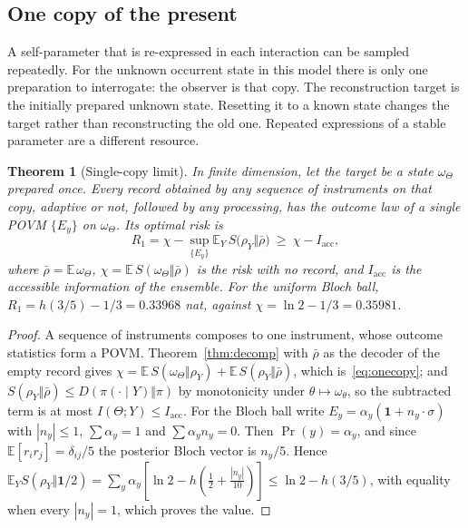 \documentclass[12pt]{article}
\newtheorem{theorem}{Theorem}[section]
\theoremstyle{definition}
\theoremstyle{remark}
\newcommand{\E}{\mathbb E}
\begin{document}
\subsection{One copy of the present}

A self-parameter that is re-expressed in each interaction can be sampled repeatedly. For the unknown occurrent state in this model there is only one preparation to interrogate: the observer is that copy. The reconstruction target is the initially prepared unknown state. Resetting it to a known state changes the target rather than reconstructing the old one. Repeated expressions of a stable parameter are a different resource.

\begin{theorem}[Single-copy limit]\label{thm:onecopy}
In finite dimension, let the target be a state $\omega_\Theta$ prepared once. Every record obtained by any sequence of instruments on that copy, adaptive or not, followed by any processing, has the outcome law of a single POVM $\{E_y\}$ on $\omega_\Theta$. Its optimal risk is
\begin{equation}\label{eq:onecopy}
R_{1}=\chi-\sup_{\{E_y\}}\E_Y\,S\bigl(\rho_Y\Vert\bar\rho\bigr)\ \ge\ \chi-I_{\mathrm{acc}},
\end{equation}
where $\bar\rho=\E\,\omega_\Theta$, $\chi=\E\,S(\omega_\Theta\Vert\bar\rho)$ is the risk with no record, and $I_{\mathrm{acc}}$ is the accessible information of the ensemble. For the uniform Bloch ball, $R_1=h(3/5)-1/3=0.33968$ nat, against $\chi=\ln2-1/3=0.35981$.
\end{theorem}

\begin{proof}
A sequence of instruments composes to one instrument, whose outcome statistics form a POVM. Theorem~\ref{thm:decomp} with $\bar\rho$ as the decoder of the empty record gives $\chi=\E\,S(\omega_\Theta\Vert\rho_Y)+\E\,S(\rho_Y\Vert\bar\rho)$, which is~\eqref{eq:onecopy}; and $S(\rho_Y\Vert\bar\rho)\le D(\pi(\cdot\mid Y)\Vert\pi)$ by monotonicity under $\theta\mapsto\omega_\theta$, so the subtracted term is at most $I(\Theta;Y)\le I_{\mathrm{acc}}$. For the Bloch ball write $E_y=\alpha_y(\mathbf 1+n_y\cdot\sigma)$ with $|n_y|\le1$, $\sum\alpha_y=1$ and $\sum\alpha_yn_y=0$. Then $\Pr(y)=\alpha_y$, and since $\E[r_ir_j]=\delta_{ij}/5$ the posterior Bloch vector is $n_y/5$. Hence $\E_Y S(\rho_Y\Vert\mathbf 1/2)=\sum_y\alpha_y[\ln2-h(\tfrac12+\tfrac{|n_y|}{10})]\le\ln2-h(3/5)$, with equality when every $|n_y|=1$, which proves the value.
\end{proof}
\end{document}
